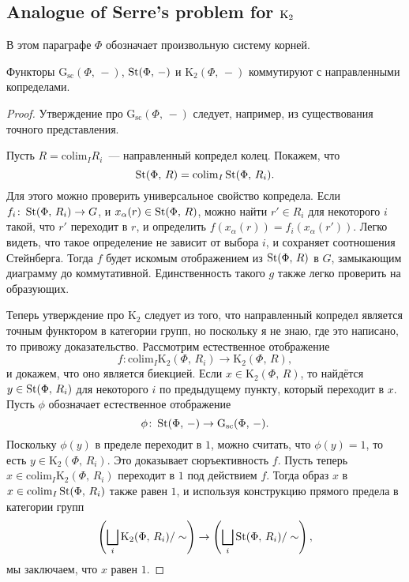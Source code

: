 \documentclass[oneside, 11pt]{amsart} \pdfoutput=1
\begin{document}
\subsection{Analogue of Serre's problem for \texorpdfstring{${\mathrm{K}}_2$}{K2}}

В этом параграфе $\Phi$ обозначает произвольную систему корней.

\begin{lemma}
\label{k2cdc}
Функторы  $\mathrm G_{\mathrm{sc}}(\Phi,\,-)$, $\mathop{\mathrm{St}}\nolimits(\Phi,\,-)$ и $\mathrm K_2(\Phi,\,-)$ коммутируют с направленными копределами. 
\end{lemma}
\begin{proof}
Утверждение про $\mathrm G_{\mathrm{sc}}(\Phi,\,-)$ следует, например, из существования точного представления. 

Пусть $R=\mathrm{colim}_I R_i$~--- направленный копредел колец. Покажем, что 
$$
\mathop{\mathrm{St}}\nolimits(\Phi,\,R)=\mathrm{colim}_I\mathop{\mathrm{St}}\nolimits(\Phi,\,R_i).
$$
Для этого можно проверить универсальное свойство копредела. Если $f_i\colon\mathop{\mathrm{St}}\nolimits(\Phi,\,R_i)\rightarrow G$, и $x_\alpha(r)\in\mathop{\mathrm{St}}\nolimits(\Phi,\,R)$, можно найти $r'\in R_i$ для некоторого $i$ такой, что $r'$ переходит в $r$, и определить $f(x_\alpha(r))=f_i(x_\alpha(r'))$. Легко видеть, что такое определение не зависит от выбора $i$, и сохраняет соотношения Стейнберга. Тогда $f$ будет искомым отображением из $\mathop{\mathrm{St}}\nolimits(\Phi,\,R)$ в $G$, замыкающим диаграмму до коммутативной. Единственность такого $g$ также легко проверить на образующих.

Теперь утверждение про $\mathrm K_2$ следует из того, что направленный копредел является точным функтором в категории групп, но поскольку я не знаю, где это написано, то привожу доказательство. Рассмотрим естественное отображение
$$
f\colon\mathrm{colim}_I\mathrm K_2(\Phi,\,R_i)\rightarrow\mathrm K_2(\Phi,\,R),
$$
и докажем, что оно является биекцией. Если $x\in\mathrm K_2(\Phi,\,R)$, то найдётся $y\in\mathop{\mathrm{St}}\nolimits(\Phi,\,R_i)$ для некоторого $i$ по предыдущему пункту, который переходит в $x$. Пусть $\phi$ обозначает естественное отображение
$$
\phi\colon\mathop{\mathrm{St}}\nolimits(\Phi,\,-)\rightarrow\mathrm G_{\mathrm{sc}}(\Phi,\,-).
$$
Поскольку $\phi(y)$ в пределе переходит в $1$, можно считать, что $\phi(y)=1$, то есть $y\in\mathrm K_2(\Phi,\,R_i)$. Это доказывает сюръективность $f$. Пусть теперь $x\in\mathrm{colim}_I\mathrm K_2(\Phi,\,R_i)$ переходит в $1$ под действием $f$. Тогда образ $x$ в $x\in\mathrm{colim}_I\mathop{\mathrm{St}}\nolimits(\Phi,\,R_i)$ также равен $1$, и используя конструкцию прямого предела в категории групп
$$
\left(\bigsqcup_i\mathrm K_2(\Phi,\,R_i)/\sim\right)\rightarrow\left(\bigsqcup_i\mathop{\mathrm{St}}\nolimits(\Phi,\,R_i)/\sim\right),
$$
мы заключаем, что $x$ равен $1$.
\end{proof}
\end{document}
